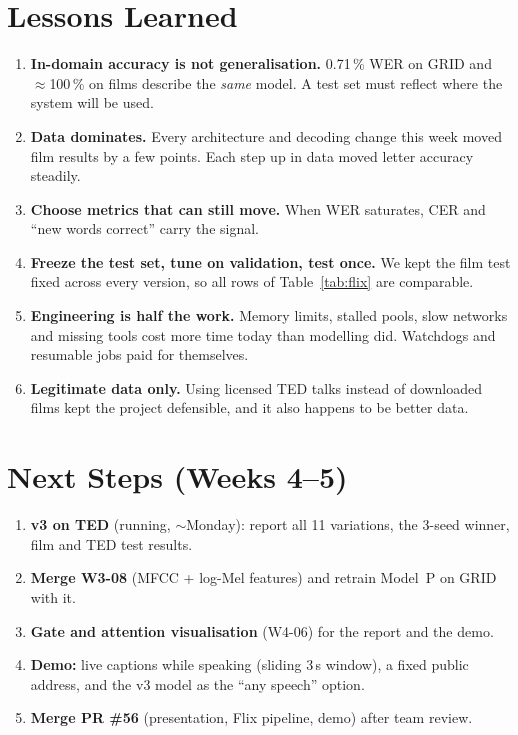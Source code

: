 \documentclass[11pt,a4paper]{article}
\begin{document}
\section{Lessons Learned}
\begin{enumerate}
  \item \textbf{In-domain accuracy is not generalisation.} 0.71\,\% WER on GRID and $\approx$100\,\%
  on films describe the \emph{same} model. A test set must reflect where the system will be used.
  \item \textbf{Data dominates.} Every architecture and decoding change this week moved film
  results by a few points. Each step up in data moved letter accuracy steadily.
  \item \textbf{Choose metrics that can still move.} When WER saturates, CER and ``new words
  correct'' carry the signal.
  \item \textbf{Freeze the test set, tune on validation, test once.} We kept the film test fixed
  across every version, so all rows of Table~\ref{tab:flix} are comparable.
  \item \textbf{Engineering is half the work.} Memory limits, stalled pools, slow networks and
  missing tools cost more time today than modelling did. Watchdogs and resumable jobs paid for
  themselves.
  \item \textbf{Legitimate data only.} Using licensed TED talks instead of downloaded films kept
  the project defensible, and it also happens to be better data.
\end{enumerate}

\section{Next Steps (Weeks 4--5)}
\begin{enumerate}
  \item \textbf{v3 on TED} (running, $\sim$Monday): report all 11 variations, the 3-seed winner,
  film and TED test results.
  \item \textbf{Merge W3-08} (MFCC + log-Mel features) and retrain Model~P on GRID with it.
  \item \textbf{Gate and attention visualisation} (W4-06) for the report and the demo.
  \item \textbf{Demo:} live captions while speaking (sliding 3\,s window), a fixed public address,
  and the v3 model as the ``any speech'' option.
  \item \textbf{Merge PR \#56} (presentation, Flix pipeline, demo) after team review.
\end{enumerate}
\end{document}
